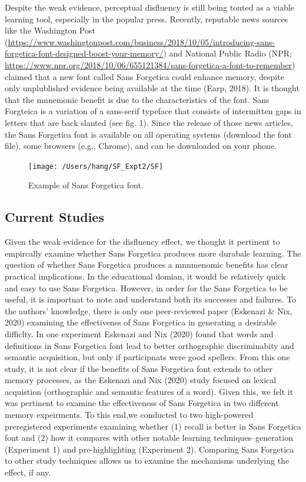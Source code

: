 \documentclass[english,pdf]{apa6}
\begin{document}
Despite the weak evidence, perceptual disfluency is still being touted as a viable learning tool, especially in the popular press. Recently, reputable news sources like the Washington Post (\url{https://www.washingtonpost.com/business/2018/10/05/introducing-sans-forgetica-font-designed-boost-your-memory/}) and National Public Radio (NPR; \url{https://www.npr.org/2018/10/06/655121384/sans-forgetica-a-font-to-remember}) claimed that a new font called Sans Forgetica could enhance memory, despite only unplublished evidence being available at the time (Earp, 2018). It is thought that the mnnemonic benefit is due to the characteristics of the font. Sans Forgteica is a variation of a sans-serif typeface that consists of intermitten gaps in letters that are back slanted (see fig. 1). Since the release of those news articles, the Sans Forgetica font is available on all operating systems (download the font file), some browsers (e.g., Chrome), and can be downloaded on your phone.

\begin{figure}
\texttt{[image: /Users/hang/SF\_Expt2/SF]} \caption{Example of Sans Forgetica font. }\label{fig:unnamed-chunk-1}
\end{figure}

\hypertarget{current-studies}{%
\subsection{Current Studies}\label{current-studies}}

Given the weak evidence for the disfluency effect, we thought it pertinent to empircally examine whether Sans Forgetica produces more durabale learning. The question of whether Sans Forgetica produces a mnnmenomic benefits has clear practical implications. In the educational domian, it would be relatively quick and easy to use Sans Forgetica. However, in order for the Sans Forgetica to be useful, it is importnat to note and understand both its successes and failures. To the authors' knowledge, there is only one peer-reviewed paper (Eskenazi \& Nix, 2020) examining the effectivenss of Sans Forgetica in generating a desirable difficlty. In one experiment Eskenazi and Nix (2020) found that words and definitions in Sans Forgetica font lead to better orthographic discriminabity and semantic acquisition, but only if participnats were good spellers. From this one study, it is not clear if the benefits of Sans Forgetica font extends to other memory processes, as the Eskenazi and Nix (2020) study focused on lexical acquistion (orthographic and semantic features of a word). Given this, we felt it was pertinent to examine the effectiveness of Sans Forgetica in two different memory expeirments. To this end,we conducted to two high-powered preregistered experiments examining whether (1) recall is better in Sans Forgetica font and (2) how it compares with other notable learning techniques--generation (Experiment 1) and pre-highlighting (Experiment 2). Comparing Sans Forgetica to other study techniques allows us to examine the mechanisms underlying the effect, if any.
\end{document}
